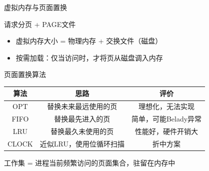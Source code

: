 \documentclass[10pt, aspectratio=169]{beamer}
\begin{document}
\begin{frame}{虚拟内存与页面置换}
    \begin{block}{请求分页 + PAGE文件}
        \begin{itemize}
            \item 虚拟内存大小 = 物理内存 + 交换文件（磁盘）
            \item 按需加载：仅当访问时，才将页从磁盘调入内存
        \end{itemize}
    \end{block}
    \begin{block}{页面置换算法}
        \begin{center}
        \begin{tabular}{|c|c|c|}
            \hline
            \textbf{算法} & \textbf{思路} & \textbf{评价} \\
            \hline
            OPT & 替换未来最远使用的页 & 理想化，无法实现 \\
            \hline
            FIFO & 替换最先进入的页 & 简单，可能Belady异常 \\
            \hline
            LRU & 替换最久未使用的页 & 性能好，硬件开销大 \\
            \hline
            CLOCK & 近似LRU，使用位循环扫描 & 折中方案 \\
            \hline
        \end{tabular}
        \end{center}
    \end{block}
    \vspace{0.3em}
    \alert{工作集 = 进程当前频繁访问的页面集合，驻留在内存中}
\end{frame}
\end{document}
